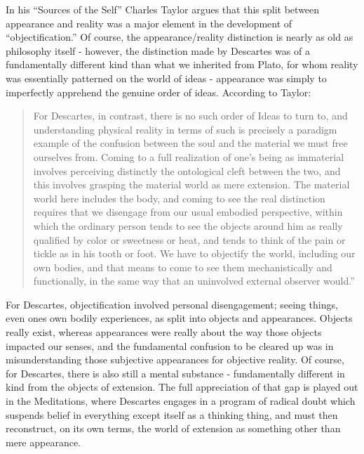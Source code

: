 \documentclass[phd,12pt,oneside,paper=letterpaper]{ubcthesis}
\begin{document}
In his ``Sources of the Self'' \citeyearpar{taylor1989} Charles Taylor argues that this split between appearance and reality was a major element in the development of ``objectification.'' Of course, the appearance/reality distinction is nearly as old as philosophy itself - however, the distinction made by Descartes was of a fundamentally different kind than what we inherited from Plato, for whom reality was essentially patterned on the world of ideas - appearance was simply to imperfectly apprehend the genuine order of ideas. According to Taylor:

\begin{quote}
For Descartes, in contrast, there is no such order of Ideas to turn to, and understanding physical reality in terms of such is precisely a paradigm example of the confusion between the soul and the material we must free ourselves from. Coming to a full realization of one's being as immaterial involves perceiving distinctly the ontological cleft between the two, and this involves grasping the material world as mere extension. The material world here includes the body, and coming to see the real distinction requires that we disengage from our usual embodied perspective, within which the ordinary person tends to see the objects around him as really qualified by color or sweetness or heat, and tends to think of the pain or tickle as in his tooth or foot. We have to objectify the world, including our own bodies, and that means to come to see them mechanistically and functionally, in the same  way that an uninvolved external observer would.'' \citep[p.145]{taylor1989}
\end{quote}

For Descartes, objectification involved personal disengagement; seeing things, even ones own bodily experiences, as split into objects and appearances. Objects really exist, whereas appearances were really about the way those objects impacted our senses, and the fundamental confusion to be cleared up was in misunderstanding those subjective appearances for objective reality. Of course, for Descartes, there is also still a mental substance - fundamentally different in kind from the objects of extension. The full appreciation of that gap is played out in the Meditations, where Descartes engages in a program of radical doubt which suspends belief in everything except itself as a thinking thing, and must then reconstruct, on its own terms, the world of extension as something other than mere appearance.
 
\end{document}
